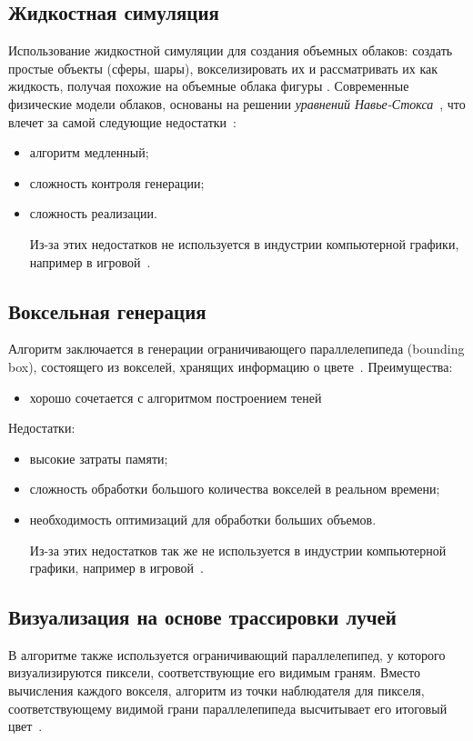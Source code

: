 \subsection{Жидкостная симуляция} 

Использование жидкостной симуляции для создания объемных облаков: создать простые объекты (сферы, шары), вокселизировать их и рассматривать их как жидкость, получая похожие на объемные облака фигуры \cite{guerrilla_volumetric_cloudscapes_2023}.
Современные физические модели облаков, основаны на решении \textit{уравнений Навье-Стокса}~\cite{sym10040125}, что влечет за самой следующие недостатки~\cite{sym10040125}:
\begin{itemize}
	\item алгоритм медленный;
	\item сложность контроля генерации;
	\item сложность реализации.
	
Из-за этих недостатков не используется в индустрии компьютерной графики, например в игровой~\cite{unigine_volumetric_clouds_2022}.
\end{itemize}
\subsection{Воксельная генерация}
Алгоритм заключается в генерации ограничивающего параллелепипеда (bounding box), состоящего из вокселей, хранящих информацию о цвете~\cite{guerrilla_volumetric_cloudscapes_2023}.
Преимущества:
\begin{itemize} 
	\item хорошо сочетается с алгоритмом построением теней
\end{itemize}
Недостатки: 
\begin{itemize} 
	\item высокие затраты памяти; 
	\item сложность обработки большого количества вокселей в реальном времени; 
	\item необходимость оптимизаций для обработки больших объемов. 
	
Из-за этих недостатков так же не используется в индустрии компьютерной графики, например в игровой~\cite{unigine_volumetric_clouds_2022}.
\end{itemize}
\subsection{Визуализация на основе трассировки лучей}
В алгоритме также используется ограничивающий параллелепипед, у которого визуализируются пиксели, соответствующие его видимым граням.
Вместо вычисления каждого вокселя, алгоритм из точки наблюдателя для пикселя, соответствующему видимой грани параллелепипеда высчитывает его итоговый цвет~\cite{Patapom2013, sym10040125}. 

